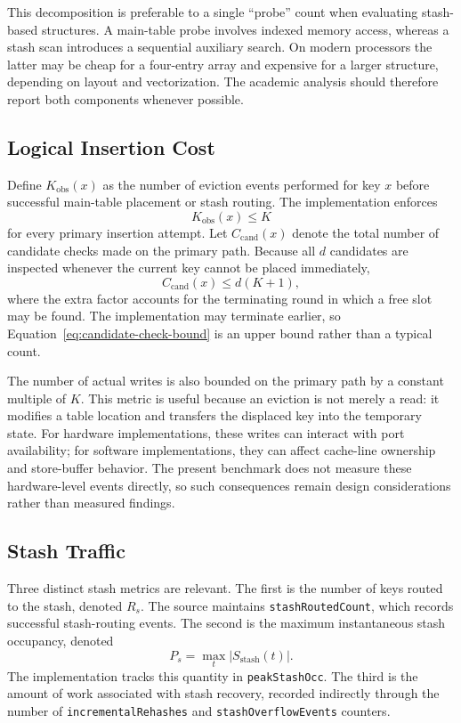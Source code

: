 \documentclass[conference]{IEEEtran}
\begin{document}
This decomposition is preferable to a single ``probe'' count when evaluating stash-based structures. A main-table probe involves indexed memory access, whereas a stash scan introduces a sequential auxiliary search. On modern processors the latter may be cheap for a four-entry array and expensive for a larger structure, depending on layout and vectorization. The academic analysis should therefore report both components whenever possible.

\subsection{Logical Insertion Cost}

Define $K_{\mathrm{obs}}(x)$ as the number of eviction events performed for key $x$ before successful main-table placement or stash routing. The implementation enforces
\begin{equation}
    K_{\mathrm{obs}}(x)\le K
    \label{eq:kobs}
\end{equation}
for every primary insertion attempt. Let $C_{\mathrm{cand}}(x)$ denote the total number of candidate checks made on the primary path. Because all $d$ candidates are inspected whenever the current key cannot be placed immediately,
\begin{equation}
    C_{\mathrm{cand}}(x)\le d(K+1),
    \label{eq:candidate-check-bound}
\end{equation}
where the extra factor accounts for the terminating round in which a free slot may be found. The implementation may terminate earlier, so Equation~\eqref{eq:candidate-check-bound} is an upper bound rather than a typical count.

The number of actual writes is also bounded on the primary path by a constant multiple of $K$. This metric is useful because an eviction is not merely a read: it modifies a table location and transfers the displaced key into the temporary state. For hardware implementations, these writes can interact with port availability; for software implementations, they can affect cache-line ownership and store-buffer behavior. The present benchmark does not measure these hardware-level events directly, so such consequences remain design considerations rather than measured findings.

\subsection{Stash Traffic}

Three distinct stash metrics are relevant. The first is the number of keys routed to the stash, denoted $R_s$. The source maintains \texttt{stashRoutedCount}, which records successful stash-routing events. The second is the maximum instantaneous stash occupancy, denoted
\begin{equation}
    P_s=\max_t |S_{\mathrm{stash}}(t)|.
    \label{eq:peak-stash}
\end{equation}
The implementation tracks this quantity in \texttt{peakStashOcc}. The third is the amount of work associated with stash recovery, recorded indirectly through the number of \texttt{incrementalRehashes} and \texttt{stashOverflowEvents} counters.
\end{document}
